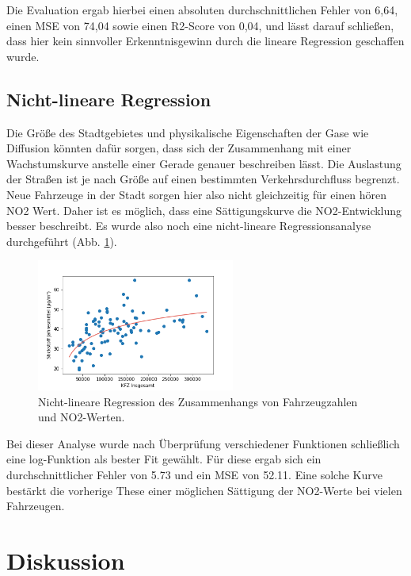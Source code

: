 \documentclass[11pt,a4paper,oneside,german]{article}
\begin{document}
	Die Evaluation ergab hierbei einen absoluten durchschnittlichen Fehler von 6,64, einen MSE von 74,04 sowie einen R2-Score von 0,04, und lässt darauf schließen, dass hier kein sinnvoller Erkenntnisgewinn durch die lineare Regression geschaffen wurde.
	
	\subsection{Nicht-lineare Regression}
	
	Die Größe des Stadtgebietes und physikalische Eigenschaften der Gase wie Diffusion könnten dafür sorgen, dass sich der Zusammenhang mit einer Wachstumskurve anstelle einer Gerade genauer beschreiben lässt. Die Auslastung der Straßen ist je nach Größe auf einen bestimmten Verkehrsdurchfluss begrenzt. Neue Fahrzeuge in der Stadt sorgen hier also nicht gleichzeitig für einen hören NO2 Wert. Daher ist es möglich, dass eine Sättigungskurve die NO2-Entwicklung besser beschreibt. Es wurde also noch eine nicht-lineare Regressionsanalyse durchgeführt (Abb. \ref{fig:nonlinreg}).
	
	\begin{figure}[H]
	\centering
	\includegraphics[width=6.5cm]{log_curve_fit.png}
	\caption{Nicht-lineare Regression des Zusammenhangs von Fahrzeugzahlen und NO2-Werten.}
	\label{fig:nonlinreg}
	\end{figure}
	
	Bei dieser Analyse wurde nach Überprüfung verschiedener Funktionen schließlich eine log-Funktion als bester Fit gewählt. Für diese ergab sich ein durchschnittlicher Fehler von 5.73 und ein MSE von 52.11. Eine solche Kurve bestärkt die vorherige These einer möglichen Sättigung der NO2-Werte bei vielen Fahrzeugen.

	
	\section{Diskussion}
	
\end{document}
